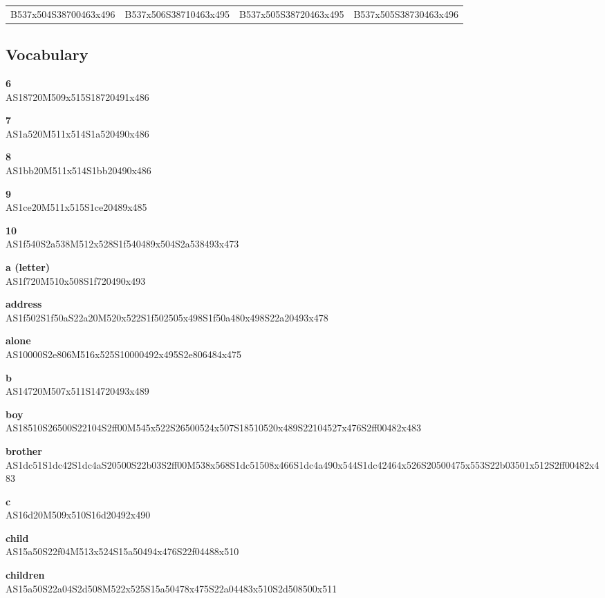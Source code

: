 \documentclass{article}
\begin{document}
\begin{center}
\begin{tabular}{*{4}{c}}
B537x504S38700463x496&B537x506S38710463x495&B537x505S38720463x495&B537x505S38730463x496\\
\end{tabular}
\end{center}

\subsection{Vocabulary}

\begin{glossary}

\textbf{6}\\
AS18720M509x515S18720491x486

\textbf{7}\\
AS1a520M511x514S1a520490x486

\textbf{8}\\
AS1bb20M511x514S1bb20490x486

\textbf{9}\\
AS1ce20M511x515S1ce20489x485

\textbf{10}\\
AS1f540S2a538M512x528S1f540489x504S2a538493x473

\textbf{a (letter)}\\
AS1f720M510x508S1f720490x493

\textbf{address}\\
AS1f502S1f50aS22a20M520x522S1f502505x498S1f50a480x498S22a20493x478

\textbf{alone}\\
AS10000S2e806M516x525S10000492x495S2e806484x475

\textbf{b}\\
AS14720M507x511S14720493x489

\textbf{boy}\\
AS18510S26500S22104S2ff00M545x522S26500524x507S18510520x489S22104527x476S2ff00482x483

\textbf{brother}\\
AS1dc51S1dc42S1dc4aS20500S22b03S2ff00M538x568S1dc51508x466S1dc4a490x544S1dc42464x526S20500475x553S22b03501x512S2ff00482x483

\textbf{c}\\
AS16d20M509x510S16d20492x490

\textbf{child}\\
AS15a50S22f04M513x524S15a50494x476S22f04488x510

\textbf{children}\\
AS15a50S22a04S2d508M522x525S15a50478x475S22a04483x510S2d508500x511


\end{glossary}
\end{document}
